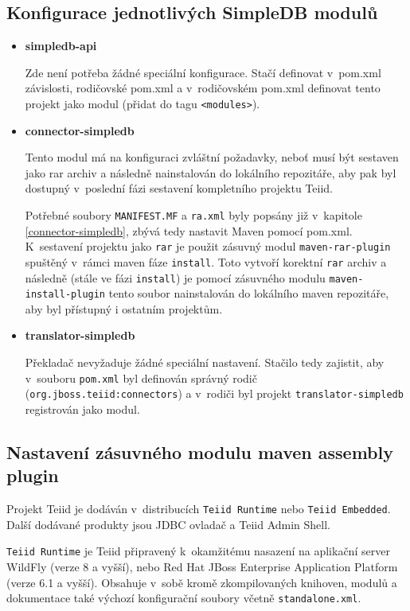 \documentclass[oneside,12pt,final]{fithesis2}
\begin{document}
\subsection{Konfigurace jednotlivých SimpleDB modulů}
\label{konfigurace}
\begin{itemize}
 \item \textbf{simpledb-api}
 
 Zde není potřeba žádné speciální konfigurace. Stačí definovat v~pom.xml závislosti, rodičovské pom.xml a v~rodičovském pom.xml definovat tento projekt jako modul (přidat do tagu \texttt{<modules>}).
 \item \textbf{connector-simpledb}
 
 Tento modul má na konfiguraci zvláštní požadavky, neboť musí být sestaven jako rar archiv a následně nainstalován do lokálního repozitáře, aby pak byl dostupný v~poslední fázi sestavení kompletního projektu Teiid.
 
 Potřebné soubory \texttt{MANIFEST.MF} a \texttt{ra.xml} byly popsány již v~kapitole \ref{connector-simpledb}, zbývá tedy nastavit Maven pomocí pom.xml.
 K~sestavení projektu jako \texttt{rar} je použit zásuvný modul \texttt{maven-rar-plugin} spuštěný v~rámci maven fáze \texttt{install}. Toto vytvoří korektní \texttt{rar} archiv a následně (stále ve fázi \texttt{install}) je pomocí zásuvného modulu \texttt{maven-install-plugin} tento soubor nainstalován do lokálního maven repozitáře, aby byl přístupný i ostatním projektům.
 
 \item \textbf{translator-simpledb}
 
 Překladač nevyžaduje žádné speciální nastavení. Stačilo tedy zajistit, aby v~souboru \texttt{pom.xml} byl definován správný rodič (\texttt{org.jboss.teiid:connectors}) a v~rodiči byl projekt \texttt{translator\allowbreak -simpledb} registrován jako modul.
\end{itemize}

\subsection{Nastavení zásuvného modulu maven assembly plugin}
Projekt Teiid je dodáván v~distribucích \texttt{Teiid Runtime} nebo \texttt{Teiid Embedded}. Další dodávané produkty jsou JDBC ovladač a Teiid Admin Shell. 

\texttt{Teiid Runtime} je Teiid připravený k~okamžitému nasazení na aplikační server WildFly (verze 8 a vyšší), nebo Red Hat JBoss Enterprise Application Platform (verze 6.1 a vyšší). Obsahuje v~sobě kromě zkompilovaných knihoven, modulů a dokumentace také výchozí konfigurační soubory včetně \texttt{standalone.xml}.
\end{document}
